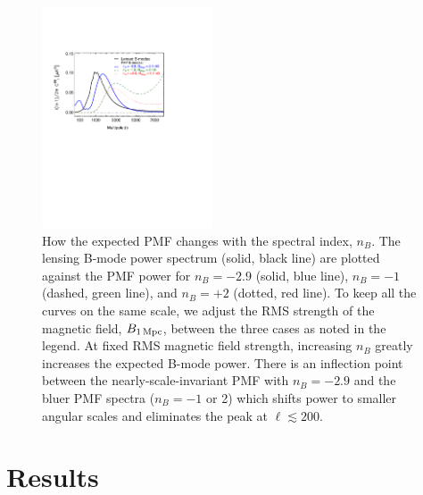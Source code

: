 \documentclass[apj]{emulateapj}
\newcommand{\bpmf}{\ensuremath{B_{\rm 1\,Mpc}}}
\begin{document}
\begin{figure}[htb]\centering
\includegraphics[width=0.45\textwidth,clip,trim={2.cm 12.cm 5.5cm 4cm}]{pmf_templates_nb.pdf}
  \caption[CMB polarization from PMFs with different spectral indices]{ \label{fig:pmf-nb}
  How the expected PMF changes with the spectral index, $n_B$. 
  The lensing B-mode power spectrum (solid, black line) are plotted against the PMF power for $n_B=-2.9$ (solid, blue line), $n_B=-1$ (dashed, green line), and $n_B=+2$ (dotted, red line). 
  To keep all the curves on the same scale, we adjust the RMS strength of the magnetic field, \bpmf{}, between the three cases as noted in the legend. 
  At fixed RMS magnetic field strength, increasing $n_B$ greatly increases the expected B-mode power. 
  There is an inflection point between the nearly-scale-invariant PMF with $n_B=-2.9$ and the bluer PMF spectra ($n_B=-1$ or 2) which shifts power to smaller angular scales and eliminates the peak at $\ell \lesssim 200$. 
  }
\end{figure}
 
\section{Results}
\label{sec:results}
\end{document}

